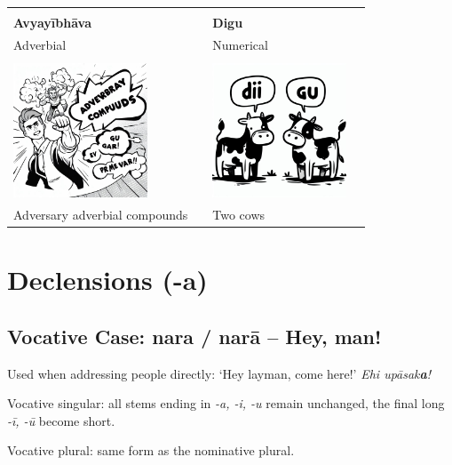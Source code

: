 \documentclass[11pt,oneside]{memoir}
\begin{document}
\begin{longtable}{L{4cm} L{4cm} L{4cm} L{4cm}}
 &  &  & \\
\textbf{Avyayībhāva} &  & \textbf{Digu} & \\
Adverbial &  & Numerical & \\
 &  &  & \\
\includegraphics[width=4cm]{./images/adverbial-compounds.jpeg} &  & \includegraphics[width=4cm]{./images/two-cows-dii-gu.jpeg} & \\
Adversary adverbial compounds &  & Two cows & \\
\end{longtable}

\clearpage
\section{Declensions (-a)}
\label{sec:org24c1abe}
\subsection{Vocative Case: nara / narā -- Hey, man!}
\label{sec:org46b4292}

Used when addressing people directly: `Hey layman, come here!' \emph{Ehi upāsak\textbf{a}!}

Vocative singular: all stems ending in \emph{-a, -i, -u} remain unchanged, the final long \emph{-ī, -ū} become short.

Vocative plural: same form as the nominative plural.
\end{document}
